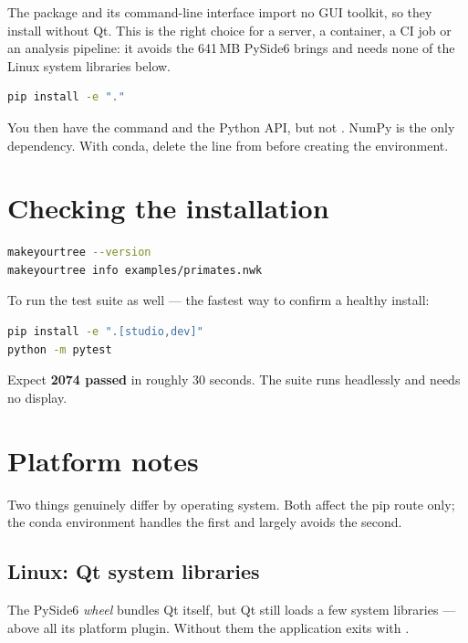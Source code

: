 The  package and its command-line interface import no GUI
toolkit, so they install without Qt. This is the right choice for a server, a
container, a CI job or an analysis pipeline: it avoids the 641\,MB PySide6 brings
and needs none of the Linux system libraries below.

\begin{lstlisting}[language=bash]
pip install -e "."
\end{lstlisting}

You then have the  command and the Python API, but not
. NumPy is the only dependency. With conda, delete the
 line from  before creating the environment.

\section{Checking the installation}

\begin{lstlisting}[language=bash]
makeyourtree --version
makeyourtree info examples/primates.nwk
\end{lstlisting}

To run the test suite as well --- the fastest way to confirm a healthy install:

\begin{lstlisting}[language=bash]
pip install -e ".[studio,dev]"
python -m pytest
\end{lstlisting}

Expect \textbf{2074 passed} in roughly 30 seconds. The suite runs headlessly and
needs no display.

\section{Platform notes}

Two things genuinely differ by operating system. Both affect the pip route only;
the conda environment handles the first and largely avoids the second.

\subsection{Linux: Qt system libraries}
\label{sec:linux-libs}

The PySide6 \emph{wheel} bundles Qt itself, but Qt still loads a few system
libraries --- above all its  platform plugin. Without them the
application exits with
.


